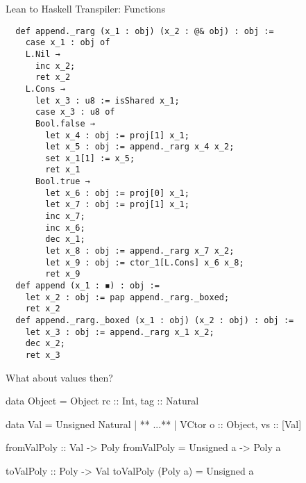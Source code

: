 \begin{frame}{Lean to Haskell Transpiler: Functions}
  \framebreak

  \begin{verbatim}
  def append._rarg (x_1 : obj) (x_2 : @& obj) : obj :=
    case x_1 : obj of
    L.Nil →
      inc x_2;
      ret x_2
    L.Cons →
      let x_3 : u8 := isShared x_1;
      case x_3 : u8 of
      Bool.false →
        let x_4 : obj := proj[1] x_1;
        let x_5 : obj := append._rarg x_4 x_2;
        set x_1[1] := x_5;
        ret x_1
      Bool.true →
        let x_6 : obj := proj[0] x_1;
        let x_7 : obj := proj[1] x_1;
        inc x_7;
        inc x_6;
        dec x_1;
        let x_8 : obj := append._rarg x_7 x_2;
        let x_9 : obj := ctor_1[L.Cons] x_6 x_8;
        ret x_9
  def append (x_1 : ◾) : obj :=
    let x_2 : obj := pap append._rarg._boxed;
    ret x_2
  def append._rarg._boxed (x_1 : obj) (x_2 : obj) : obj :=
    let x_3 : obj := append._rarg x_1 x_2;
    dec x_2;
    ret x_3
  \end{verbatim}


  \framebreak

  What about values then?


  \framebreak

  \begin{HaskellCode}
    data Object = Object { rc :: Int, tag :: Natural }

    data Val
      = Unsigned Natural
      | ** ...**
      | VCtor { o :: Object, vs :: [Val] }

    fromValPoly :: Val -> Poly
    fromValPoly = \case
      Unsigned a -> Poly a

    toValPoly :: Poly -> Val
    toValPoly (Poly a) = Unsigned a
  \end{HaskellCode}



\end{frame}
